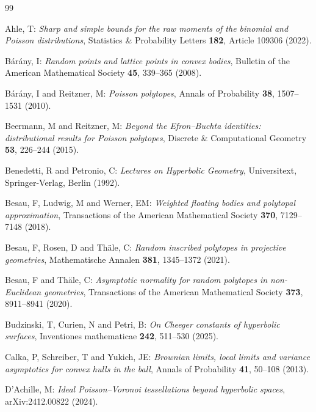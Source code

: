 \documentclass[11pt,a4paper]{article}
\theoremstyle{plain}
\theoremstyle{definition}
\theoremstyle{remark}
\begin{document}

\begin{thebibliography}{99}

	Ahle, T:
	\emph{Sharp and simple bounds for the raw moments of the binomial and Poisson distributions},
	Statistics \& Probability Letters \textbf{182}, Article 109306 (2022).

	B\'ar\'any, I:
	\emph{Random points and lattice points in convex bodies},
	Bulletin of the American Mathematical Society \textbf{45}, 339--365 (2008).

	B\'ar\'any, I and Reitzner, M:
	\emph{Poisson polytopes},
	Annals of Probability \textbf{38}, 1507--1531 (2010).

	Beermann, M and Reitzner, M:
	\emph{Beyond the Efron--Buchta identities: distributional results for Poisson polytopes},
	Discrete \& Computational Geometry \textbf{53}, 226--244 (2015).

	Benedetti, R and Petronio, C:
	\emph{Lectures on Hyperbolic Geometry},
	Universitext, Springer-Verlag, Berlin (1992).

	Besau, F, Ludwig, M and Werner, EM:
	\emph{Weighted floating bodies and polytopal approximation},
	Transactions of the American Mathematical Society \textbf{370}, 7129--7148 (2018).

	Besau, F, Rosen, D and Th\"ale, C:
	\emph{Random inscribed polytopes in projective geometries},
	Mathema\-tische Annalen \textbf{381}, 1345--1372 (2021).

	Besau, F and Th\"ale, C:
	\emph{Asymptotic normality for random polytopes in non-Euclidean geometries},
	Transactions of the American Mathematical Society \textbf{373}, 8911--8941 (2020).

	Budzinski, T, Curien, N and Petri, B:
	\emph{On Cheeger constants of hyperbolic surfaces},
	Inventiones mathematicae \textbf{242}, 511--530 (2025).

	Calka, P, Schreiber, T and Yukich, JE:
	\emph{Brownian limits, local limits and variance asymptotics for convex hulls in the ball},
	Annals of Probability \textbf{41}, 50--108 (2013).

	D'Achille, M:
	\emph{Ideal Poisson--Voronoi tessellations beyond hyperbolic spaces},
	arXiv:2412.00822 (2024).


\end{thebibliography}
\end{document}
